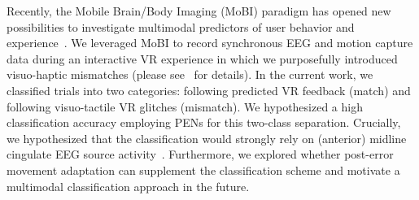 Recently, the Mobile Brain/Body Imaging (MoBI) paradigm has opened new possibilities to investigate multimodal predictors of user behavior and experience~\cite{Makeig2009-je, Gramann2011-fr, Gramann2014-qo, Jungnickel2019-mv}. We leveraged MoBI to record synchronous EEG and motion capture data during an interactive VR experience in which we purposefully introduced visuo-haptic mismatches (please see~\cite{Gehrke2019-og} for details). In the current work, we classified trials into two categories: following predicted VR feedback (match) and following visuo-tactile VR glitches (mismatch). We hypothesized a high classification accuracy employing PENs for this two-class separation. Crucially, we hypothesized that the classification would strongly rely on (anterior) midline cingulate EEG source activity~\cite{Zander2016-ed, Tollner2017-rm}. Furthermore, we explored whether post-error movement adaptation can supplement the classification scheme and motivate a multimodal classification approach in the future. 






